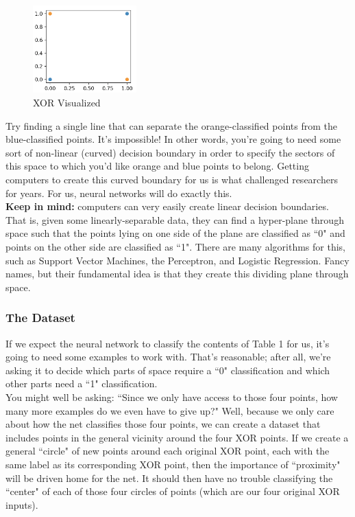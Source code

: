 \documentclass{article}
\begin{document}
\begin{figure}[htp]
    \centering
    \includegraphics[width=4cm]{xor_no_pertub.png}
    \caption{XOR Visualized}
\end{figure}
Try finding a single line that can separate the orange-classified points from the blue-classified points. It's impossible! In other words, you're going to need some sort of non-linear (curved) decision boundary in order to specify the sectors of this space to which you'd like orange and blue points to belong. Getting computers to create this curved boundary for us is what challenged researchers for years. For us, neural networks will do exactly this. \\

\textbf{Keep in mind:} computers can very easily create linear decision boundaries. That is, given some linearly-separable data, they can find a hyper-plane through space such that the points lying on one side of the plane are classified as ``0" and points on the other side are classified as ``1". There are many algorithms for this, such as Support Vector Machines, the Perceptron, and Logistic Regression. Fancy names, but their fundamental idea is that they create this dividing plane through space.

\subsubsection{The Dataset}
If we expect the neural network to classify the contents of Table 1 for us, it's going to need some examples to work with. That's reasonable; after all, we're asking it to decide which parts of space require a ``0" classification and which other parts need a ``1" classification.\\

You might well be asking: ``Since we only have access to those four points, how many more examples do we even have to give up?" Well, because we only care about how the net classifies those four points, we can create a dataset that includes points in the general vicinity around the four XOR points. If we create a general ``circle" of new points around each original XOR point, each with the same label as its corresponding XOR point, then the importance of ``proximity" will be driven home for the net. It should then have no trouble classifying the ``center" of each of those four circles of points (which are our four original XOR inputs). \\
\end{document}
